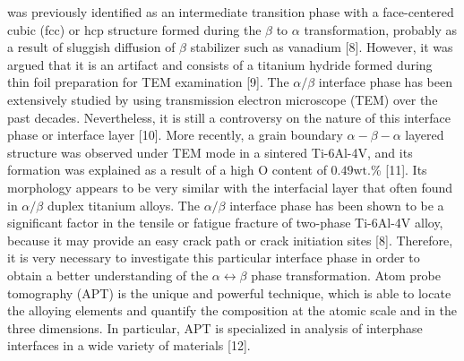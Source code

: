 \documentclass[10pt]{article}
\begin{document}
was previously identified as an intermediate transition phase with a face-centered cubic (fcc) or hcp structure formed during the $\beta$ to $\alpha$ transformation, probably as a result of sluggish diffusion of $\beta$ stabilizer such as vanadium [8]. However, it was argued that it is an artifact and consists of a titanium hydride formed during thin foil preparation for TEM examination [9]. The $\alpha / \beta$ interface phase has been extensively studied by using transmission electron microscope (TEM) over the past decades. Nevertheless, it is still a controversy on the nature of this interface phase or interface layer [10]. More recently, a grain boundary $\alpha-\beta-\alpha$ layered structure was observed under TEM mode in a sintered Ti-6Al-4V, and its formation was explained as a result of a high O content of $0.49 \mathrm{wt}$.\% [11]. Its morphology appears to be very similar with the interfacial layer that often found in $\alpha / \beta$ duplex titanium alloys. The $\alpha / \beta$ interface phase has been shown to be a significant factor in the tensile or fatigue fracture of two-phase Ti-6Al-4V alloy, because it may provide an easy crack path or crack initiation sites [8]. Therefore, it is very necessary to investigate this particular interface phase in order to obtain a better understanding of the $\alpha \leftrightarrow \beta$ phase transformation. Atom probe tomography (APT) is the unique and powerful technique, which is able to locate the alloying elements and quantify the composition at the atomic scale and in the three dimensions. In particular, APT is specialized in analysis of interphase interfaces in a wide variety of materials [12].
\end{document}
